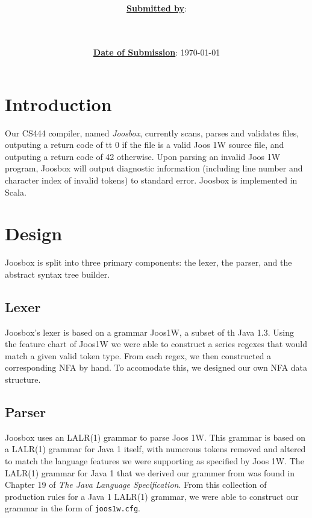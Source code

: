 \documentclass[letterpaper]{article}
\title{\course \\ \term \\ \project}
\date{\ul{\textbf{Date of Submission}}: \today}
\author{\ul{\textbf{Submitted by}}: \\ \indent \wenhao \\ \indent \chris \\ \indent \peter}
\begin{document}
  \maketitle
  \thispagestyle{empty}
  \clearpage

  \tableofcontents
  \thispagestyle{empty}
  \clearpage

  \setcounter{page}{1}

  \clearpage
  \section{Introduction}

  Our CS444 compiler, named {\em Joosbox}, currently scans, parses and
  validates files, outputing a return code of {tt 0} if the file is a valid
  Joos 1W source file, and outputing a return code of 42 otherwise. Upon
  parsing an invalid Joos 1W program, Joosbox will output diagnostic
  information (including line number and character index of invalid tokens) to
  standard error. Joosbox is implemented in Scala.

  \section{Design}

  Joosbox is split into three primary components: the lexer, the parser, and
  the abstract syntax tree builder.

  \subsection{Lexer}

  Joosbox's lexer is based on a grammar Joos1W, a subset of th Java 1.3. Using
  the feature chart of Joos1W we were able to construct a series regexes that
  would match a given valid token type. From each regex, we then constructed a
  corresponding NFA by hand. To accomodate this, we designed our own NFA data
  structure.

  \subsection{Parser}

  Joosbox uses an LALR(1) grammar to parse Joos 1W. This grammar is based on a
  LALR(1) grammar for Java 1 itself, with numerous tokens removed and altered to
  match the language features we were supporting as specified by Joos 1W. The
  LALR(1) grammar for Java 1 that we derived our grammer from was found in
  Chapter 19 of {\em The Java Language Specification}. From this collection of
  production rules for a Java 1 LALR(1) grammar, we were able to construct our
  grammar in the form of {\tt joos1w.cfg}.
\end{document}
